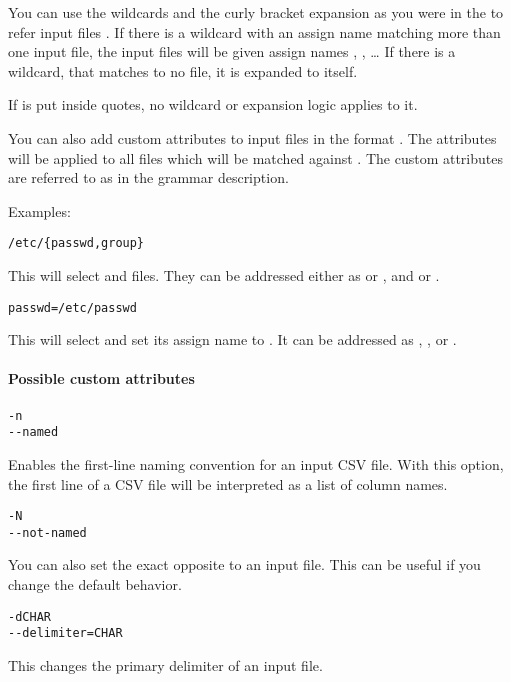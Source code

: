 You can use the wildcards and the curly bracket expansion as you were in the  to refer input files \cite{bash-reference-manual}. 
If there is a wildcard with an assign name  matching more than one input file, the input files will be given assign names , , \ldots{}
If there is a wildcard, that matches to no file, it is expanded to itself.

If  is put inside  quotes, no wildcard or expansion logic applies to it.

You can also add custom attributes to input files in the format . The attributes will be applied to all files which will be matched against .
The custom attributes are referred to as  in the grammar description.

Examples:
\begin{verbatim}
/etc/{passwd,group}
\end{verbatim}

This will select  and  files. They can be addressed either as  or , and  or .

\begin{verbatim}
passwd=/etc/passwd
\end{verbatim}
This will select  and set its assign name to . It can be addressed as , , or .


\paragraph{Possible custom attributes}

\begin{verbatim}
-n
--named
\end{verbatim}
Enables the first-line naming convention for an input CSV file.
With this option, the first line of a CSV file will be interpreted as a list of column names.


\begin{verbatim}
-N
--not-named
\end{verbatim}
You can also set the exact opposite to an input file. This can be useful if you change the default behavior.

\begin{verbatim}
-dCHAR
--delimiter=CHAR
\end{verbatim}
This changes the primary delimiter of an input file.

